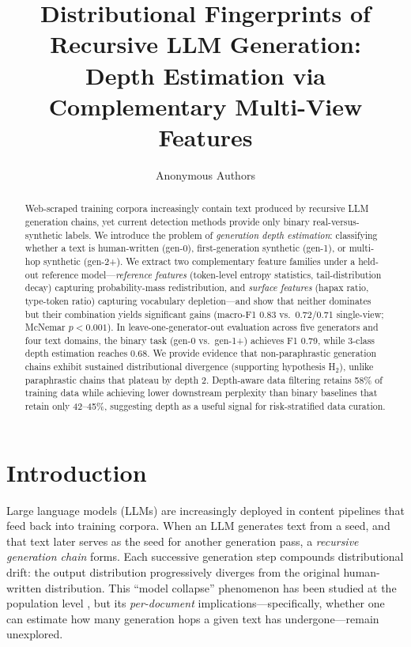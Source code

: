 \documentclass[letterpaper,11pt]{article}
\title{Distributional Fingerprints of Recursive LLM Generation:\\Depth Estimation via Complementary Multi-View Features}
\author{
Anonymous Authors
}
\begin{document}
\maketitle

\begin{abstract}
Web-scraped training corpora increasingly contain text produced by recursive LLM generation chains, yet current detection methods provide only binary real-versus-synthetic labels. We introduce the problem of \emph{generation depth estimation}: classifying whether a text is human-written (gen-0), first-generation synthetic (gen-1), or multi-hop synthetic (gen-2+). We extract two complementary feature families under a held-out reference model---\emph{reference features} (token-level entropy statistics, tail-distribution decay) capturing probability-mass redistribution, and \emph{surface features} (hapax ratio, type-token ratio) capturing vocabulary depletion---and show that neither dominates but their combination yields significant gains (macro-F1 0.83 vs.\ 0.72/0.71 single-view; McNemar $p < 0.001$). In leave-one-generator-out evaluation across five generators and four text domains, the binary task (gen-0 vs.\ gen-1+) achieves F1 0.79, while 3-class depth estimation reaches 0.68. We provide evidence that non-paraphrastic generation chains exhibit sustained distributional divergence (supporting hypothesis H$_2$), unlike paraphrastic chains that plateau by depth 2. Depth-aware data filtering retains 58\% of training data while achieving lower downstream perplexity than binary baselines that retain only 42--45\%, suggesting depth as a useful signal for risk-stratified data curation.
\end{abstract}

\section{Introduction}
\label{sec:intro}

Large language models (LLMs) are increasingly deployed in content pipelines that feed back into training corpora. When an LLM generates text from a seed, and that text later serves as the seed for another generation pass, a \emph{recursive generation chain} forms. Each successive generation step compounds distributional drift: the output distribution progressively diverges from the original human-written distribution. This ``model collapse'' phenomenon has been studied at the population level \cite{shumailov2023curse}, but its \emph{per-document} implications---specifically, whether one can estimate how many generation hops a given text has undergone---remain unexplored.
\end{document}
